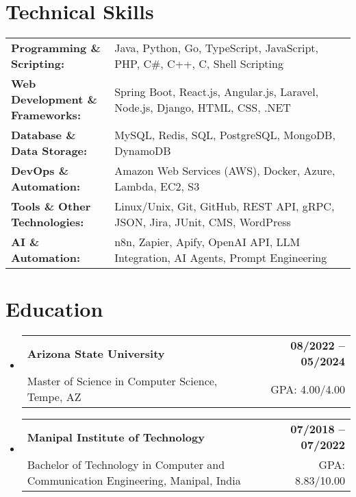 \documentclass[letterpaper,11pt]{article}
\makeatletter
\newcommand{\educationSubheading}[4]{
  \vspace{-2pt}\item
    \begin{tabular*}{1.0\textwidth}[t]{l@{\extracolsep{\fill}}r}
      \textbf{\small #1} & \textbf{\small #2} \\
      {\small#3} & {\small #4} \\
    \end{tabular*}\vspace{-7pt}
}
\newcommand{\resumeSubHeadingListStart}{\begin{itemize}[leftmargin=0pt, label={}]}
\newcommand{\resumeSubHeadingListEnd}{\end{itemize}}
\makeatother
\begin{document}
\section{Technical Skills}
        \vspace{-14pt}
        \begin{table}[h]
            \footnotesize
            \begin{tabular}{p{0.3\linewidth} p{0.7\linewidth}}
                \textbf{Programming \& Scripting:} & Java, Python, Go, TypeScript, JavaScript, PHP, C\#, C++, C, Shell Scripting \\
                \textbf{Web Development \& Frameworks:} & Spring Boot, React.js, Angular.js, Laravel, Node.js, Django, HTML, CSS, .NET \\
                \textbf{Database \& Data Storage:} & MySQL, Redis, SQL, PostgreSQL, MongoDB, DynamoDB \\
                \textbf{DevOps \& Automation:} & Amazon Web Services (AWS), Docker, Azure, Lambda, EC2, S3 \\
                \textbf{Tools \& Other Technologies:} & Linux/Unix, Git, GitHub, REST API, gRPC, JSON, Jira, JUnit, CMS, WordPress \\
                \textbf{AI \& Automation:} & n8n, Zapier, Apify, OpenAI API, LLM Integration, AI Agents, Prompt Engineering \\
            \end{tabular}
        \end{table}

 \vspace{-15pt}

\section{Education}
  \resumeSubHeadingListStart
    \educationSubheading
      {Arizona State University}{08/2022 -- 05/2024}
      {Master of Science in Computer Science, Tempe, AZ}{GPA: 4.00/4.00}

    \educationSubheading
      {Manipal Institute of Technology}{07/2018 -- 07/2022}
      {Bachelor of Technology in Computer and Communication Engineering, Manipal, India}{GPA: 8.83/10.00}
  \resumeSubHeadingListEnd
\end{document}
